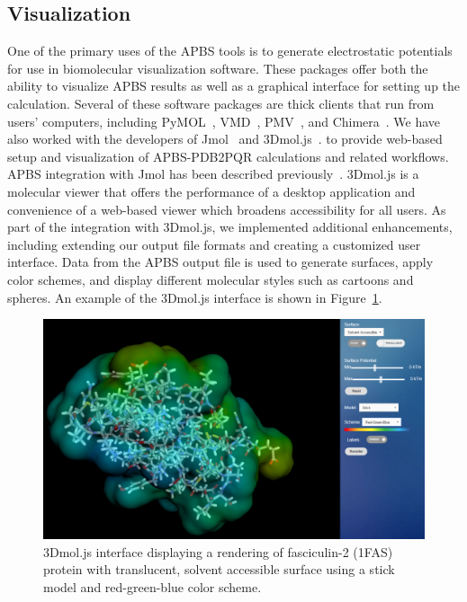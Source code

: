 \documentclass[12pt,titlepage]{article}
\begin{document}
\subsection{Visualization}
One of the primary uses of the APBS tools is to generate electrostatic potentials for use in biomolecular visualization software.
These packages offer both the ability to visualize APBS results as well as a graphical interface for setting up the calculation.
Several of these software packages are thick clients that run from users' computers, including PyMOL~\cite{PyMOL, PyMOLweb}, VMD~\cite{VMDweb, Humphrey1996}, 
PMV~\cite{PMV, MGLToolsweb}, and Chimera~\cite{Chimeraweb, Pettersen2004}.
We have also worked with the developers of Jmol~\cite{Jmolweb, Herraez2006} and 3Dmol.js~\cite{3Dmolweb, Rego2015}. to provide web-based setup and visualization of APBS-PDB2PQR calculations and related workflows.
APBS integration with Jmol has been described previously~\cite{Unni2011}.
3Dmol.js is a molecular viewer that offers the performance of a desktop application and convenience of a web-based viewer which broadens accessibility for all users.
As part of the integration with 3Dmol.js, we implemented additional enhancements, including extending our output file formats and creating a customized user interface.
Data from the APBS output file is used to generate surfaces, apply color schemes, and display different molecular styles such as cartoons and spheres.
An example of the 3Dmol.js interface is shown in Figure~\ref{fig:3dmol_interface}.
\begin{figure} 
	\begin{center}
		\includegraphics[width=.80\textwidth]{3dmol_interface}
		\caption{3Dmol.js interface displaying a rendering of fasciculin-2 (1FAS) protein with translucent, solvent accessible surface using a stick model and red-green-blue color scheme. \label{fig:3dmol_interface}}  
	\end{center}  
\end{figure}
\end{document}
